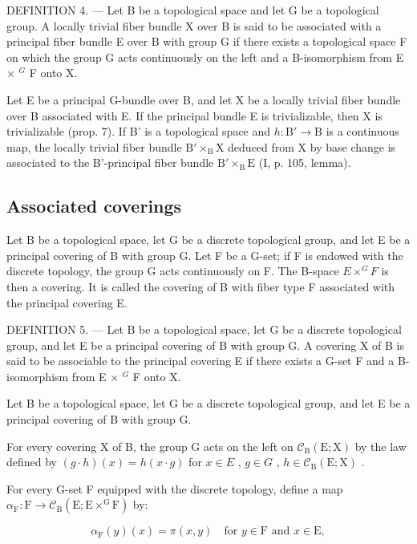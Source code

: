 DEFINITION 4. --- Let B be a topological space and let G be a topological group. A locally trivial fiber bundle X over B is said to be associated with a principal fiber bundle E over B with group G if there exists a topological space F on which the group G acts continuously on the left and a B-isomorphism from E × \(^{G}\) F onto X.

Let E be a principal G-bundle over B, and let X be a locally trivial fiber bundle over B associated with E. If the principal bundle E is trivializable, then X is trivializable (prop. 7). If B' is a topological space and \(h \colon \mathrm{B}' \to \mathrm{B}\) is a continuous map, the locally trivial fiber bundle \(\mathrm{B}' \times_{\mathrm{B}} \mathrm{X}\) deduced from X by base change is associated to the B'-principal fiber bundle \(\mathrm{B}' \times_{\mathrm{B}} \mathrm{E}\) (I, p. 105, lemma).

\subsection{Associated coverings}

Let B be a topological space, let G be a discrete topological group, and let E be a principal covering of B with group G. Let F be a G-set; if F is endowed with the discrete topology, the group G acts continuously on F. The B-space \(E \times^{G} F\) is then a covering. It is called the covering of B with fiber type F associated with the principal covering E.

DEFINITION 5. --- Let B be a topological space, let G be a discrete topological group, and let E be a principal covering of B with group G. A covering X of B is said to be associable to the principal covering E if there exists a G-set F and a B-isomorphism from E × \(^{G}\) F onto X.

Let B be a topological space, let G be a discrete topological group, and let E be a principal covering of B with group G.

For every covering X of B, the group G acts on the left on \(\mathcal{C}_{\mathrm{B}}(\mathrm{E};\mathrm{X})\) by the law defined by \((g\cdot h)(x)=h(x\cdot g)\) for \(x\in E\) , \(g\in G\) , \(h\in\mathcal{C}_{\mathrm{B}}(\mathrm{E};\mathrm{X})\) .

For every G-set F equipped with the discrete topology, define a map \(\alpha_{\mathrm{F}}\colon \mathrm{F}\to \mathcal{C}_{\mathrm{B}}(\mathrm{E};\mathrm{E}\times^{\mathrm{G}}\mathrm{F})\) by:

\[
\alpha_ {\mathrm{F}} (y) (x) = \pi (x, y) \quad \text {for } y \in \mathrm{F} \text { and } x \in \mathrm{E},\tag{2}
\]

